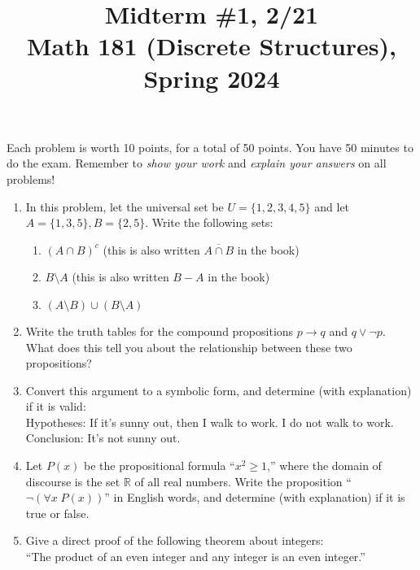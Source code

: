 \documentclass[11pt]{article}
\title{Midterm \#1, 2/21 \\Math 181 (Discrete Structures), Spring 2024}
\date{}
\begin{document}
\maketitle

\thispagestyle{empty}

\vspace{-1cm}

Each problem is worth 10 points, for a total of 50 points. You have 50 minutes to do the exam. Remember to \emph{show your work} and \emph{explain your answers} on all problems! 

\begin{enumerate}
\item In this problem, let the universal set be $U = \{1,2,3,4,5\}$ and let $A=\{1,3,5\}, B=\{2,5\}$. Write the following sets:
\begin{enumerate}
\item $(A\cap B)^c$ \hfill (this is also written $\overline{A\cap B}$ in the book)
\item $B \setminus A$ \hfill (this is also written $B-A$ in the book)
\item $(A \setminus B) \cup (B \setminus A)$
\end{enumerate}
\item Write the truth tables for the compound propositions $p \to q$ and $q \vee \neg p$. What does this tell you about the relationship between these two propositions?
\item Convert this argument to a symbolic form, and determine (with explanation) if it is valid: \\[0.5em]
Hypotheses: If it's sunny out, then I walk to work. I do not walk to work. \\
Conclusion: It's not sunny out.
\item Let $P(x)$ be the propositional formula ``$x^2 \geq 1$,'' where the domain of discourse is the set $\mathbb{R}$ of all real numbers. Write the proposition ``$\neg (\forall x \; P(x))$'' in English words, and determine (with explanation) if it is true or false.
\item Give a direct proof of the following theorem about integers: \\ ``The product of an even integer and any integer is an even integer.''
\end{enumerate}
\end{document}
